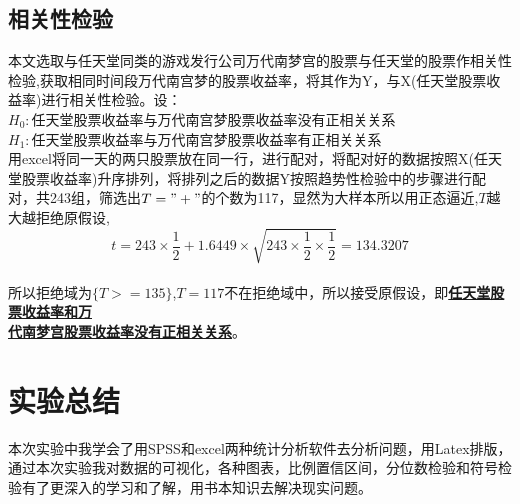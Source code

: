 \documentclass[a4paper, 11pt]{article}
\begin{document}
	\subsection{相关性检验}
	本文选取与任天堂同类的游戏发行公司万代南梦宫的股票与任天堂的股票作相关性检验,获取相同时间段万代南宫梦的股票收益率，将其作为Y，与X(任天堂股票收益率)进行相关性检验。设：
	\\$H_{0}:$任天堂股票收益率与万代南宫梦股票收益率没有正相关关系
	\\$H_{1}:$任天堂股票收益率与万代南宫梦股票收益率有正相关关系
	\\用excel将同一天的两只股票放在同一行，进行配对，将配对好的数据按照X(任天堂股票收益率)升序排列，将排列之后的数据Y按照趋势性检验中的步骤进行配对，共243组，筛选出$T="+"$的个数为117，显然为大样本所以用正态逼近,$ T $越大越拒绝原假设,
	$$t=243\times \frac{1}{2}+1.6449\times \sqrt{243\times \frac{1}{2}\times \frac{1}{2}}=134.3207$$
	\\所以拒绝域为$\{T>=135\}$,$T=117$不在拒绝域中，所以接受原假设，即\textbf{\underline{任天堂股票收益率和万}}\\\textbf{\underline{代南梦宫股票收益率没有正相关关系}}。
	\section{实验总结}
	本次实验中我学会了用SPSS和excel两种统计分析软件去分析问题，用Latex排版，通过本次实验我对数据的可视化，各种图表，比例置信区间，分位数检验和符号检验有了更深入的学习和了解，用书本知识去解决现实问题。
\end{document}
